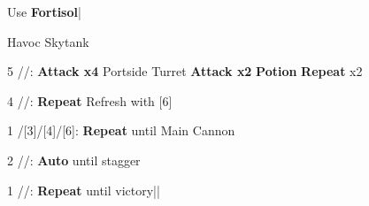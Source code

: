 \begin{mainlist}
	\item Use \textbf{Fortisol}|
\end{mainlist}
\begin{fight}{Havoc Skytank}
	\item [5] \com/\com/\syn: \textbf{Attack x4} Portside Turret \to \textbf{Attack x2} \to \textbf{Potion} \to \textbf{Repeat} x2
	\item [4] \com/\com/\med: \textbf{Repeat} \to Refresh with [6]
	\item [1]/[3]/[4]/[6]: \textbf{Repeat} until Main Cannon
	\item [2] \rav/\com/\rav: \textbf{Auto} until stagger
	\item [1] \com/\com/\rav: \textbf{Repeat} until victory|\skip|\save
\end{fight}
